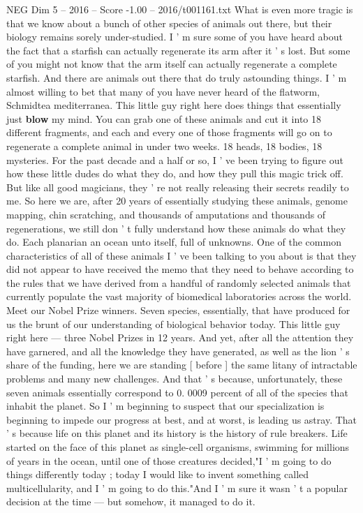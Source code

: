\begin{textsample}{NEG Dim 5 – 2016 – Score -1.00 – 2016/t001161.txt}
What is even more tragic is that we know about a bunch of other species of animals out there, but their biology remains sorely under-studied.
I ' m sure some of you have heard about the fact that a starfish can actually regenerate its arm after it ' s lost.
But some of you might not know that the arm itself can actually regenerate a complete starfish.
And there are animals out there that do truly astounding things.
I ' m almost willing to bet that many of you have never heard of the flatworm, Schmidtea mediterranea.
This little guy right here does things that essentially just \textbf{blow} my mind.
You can grab one of these animals and cut it into 18 different fragments, and each and every one of those fragments will go on to regenerate a complete animal in under two weeks. 18 heads, 18 bodies, 18 mysteries.
For the past decade and a half or so, I ' ve been trying to figure out how these little dudes do what they do, and how they pull this magic trick off.
But like all good magicians, they ' re not really releasing their secrets readily to me.
So here we are, after 20 years of essentially studying these animals, genome mapping, chin scratching, and thousands of amputations and thousands of regenerations, we still don ' t fully understand how these animals do what they do.
Each planarian an ocean unto itself, full of unknowns.
One of the common characteristics of all of these animals I ' ve been talking to you about is that they did not appear to have received the memo that they need to behave according to the rules that we have derived from a handful of randomly selected animals that currently populate the vast majority of biomedical laboratories across the world.
Meet our Nobel Prize winners.
Seven species, essentially, that have produced for us the brunt of our understanding of biological behavior today.
This little guy right here — three Nobel Prizes in 12 years.
And yet, after all the attention they have garnered, and all the knowledge they have generated, as well as the lion ' s share of the funding, here we are standing [ before ] the same litany of intractable problems and many new challenges.
And that ' s because, unfortunately, these seven animals essentially correspond to 0. 0009 percent of all of the species that inhabit the planet.
So I ' m beginning to suspect that our specialization is beginning to impede our progress at best, and at worst, is leading us astray.
That ' s because life on this planet and its history is the history of rule breakers.
Life started on the face of this planet as single-cell organisms, swimming for millions of years in the ocean, until one of those creatures decided,"I ' m going to do things differently today ; today I would like to invent something called multicellularity, and I ' m going to do this."And I ' m sure it wasn ' t a popular decision at the time — but somehow, it managed to do it.

\end{textsample}
